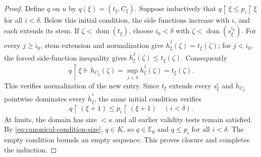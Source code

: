 \documentclass[11pt,a4paper]{amsart}
\theoremstyle{definition}
\theoremstyle{remark}
\newcommand{\EE}{\mathbb E}
\DeclareMathOperator{\dom}{dom}
\begin{document}
\begin{proof}
Define \(q\) on \(u\) by \(q(\xi)=(t_\xi,C_\xi)\).
Suppose inductively that
\(q\restriction\xi\leq p_i\restriction\xi\) for
all \(i<\delta\). Below this initial condition, the
side functions increase with \(i\), and each extends
its stem. If \(\zeta<\dom(t_\xi)\), choose
\(i_0<\delta\) with \(\zeta<\dom(s_\xi^{i_0})\).
For every \(j\geq i_0\), stem extension and
normalization give
\(\dot h_\xi^j(\zeta)=t_\xi(\zeta)\); for
\(j<i_0\), the forced side-function inequality gives
\(\dot h_\xi^j(\zeta)\leq t_\xi(\zeta)\).
Consequently
\[
 q\restriction\xi\Vdash
 \dot h_{C_\xi}(\zeta)
      =\sup_{j<\delta}\dot h_\xi^j(\zeta)=t_\xi(\zeta).
\]
This verifies normalization of the new entry. Since
\(t_\xi\) extends every \(s_\xi^i\) and
\(\dot h_{C_\xi}\) pointwise dominates every
\(\dot h_\xi^i\), the same initial condition verifies
\[
 q\restriction(\xi+1)\leq p_i\restriction(\xi+1)
                                      \quad(i<\delta).
\]
At limits, the domain has size \(<\kappa\) and all
earlier validity tests remain satisfied. By
\eqref{eq:canonical-condition-size}, \(q\in K\),
so \(q\in\EE_\theta\) and \(q\leq p_i\) for
all \(i<\delta\). The empty condition bounds an
empty sequence. This proves closure and completes the
induction.
\end{proof}
\end{document}
